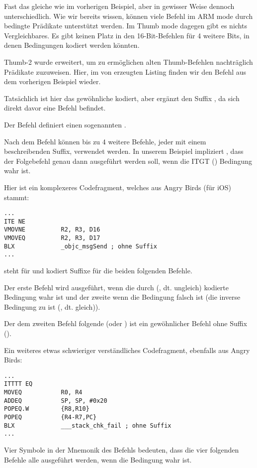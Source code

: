 Fast das gleiche wie im vorherigen Beispiel, aber in gewisser Weise dennoch unterschiedlich.
Wie wir bereits wissen, können viele Befehl im ARM mode durch bedingte Prädikate unterstützt werden.
Im Thumb mode dagegen gibt es nichts Vergleichbares.
Es gibt keinen Platz in den 16-Bit-Befehlen für 4 weitere Bits, in denen Bedingungen kodiert werden könnten.

Thumb-2 wurde erweitert, um zu ermöglichen alten Thumb-Befehlen nachträglich Prädikate zuzuweisen. Hier, im von \IDA
erzeugten Listing finden wir den  Befehl aus dem vorherigen Beispiel wieder.

Tatsächlich ist hier das gewöhnliche  kodiert, aber \IDA ergänzt den Suffix , da sich direkt davor
eine  Befehl befindet.

\label{ARM_Thumb_IT}
Der  Befehl definiert einen sogenannten .

Nach dem Befehl können bis zu 4 weitere Befehle, jeder mit einem beschreibenden Suffix, verwendet werden.
In unserem Beispiel impliziert , dass der Folgebefehl genau dann ausgeführt werden soll, wenn die IT{GT}
() Bedingung wahr ist.

Hier ist ein komplexeres Codefragment, welches aus Angry Birds (für iOS) stammt:

\begin{lstlisting}[caption=Angry Birds Classic,style=customasmARM]
...
ITE NE
VMOVNE          R2, R3, D16
VMOVEQ          R2, R3, D17
BLX             _objc_msgSend ; ohne Suffix
...
\end{lstlisting}

 steht für  und kodiert Suffixe für die beiden folgenden Befehle.

Der erste Befehl wird ausgeführt, wenn die durch  (, dt. ungleich) kodierte Bedingung wahr
ist und der zweite wenn die Bedingung falsch ist (die inverse Bedingung zu  ist  (, dt.
gleich)).

Der dem zweiten Befehl folgende  (oder ) ist ein gewöhnlicher Befehl ohne Suffix ().

Ein weiteres etwas schwieriger verständliches Codefragment, ebenfalls aus Angry Birds:

\begin{lstlisting}[caption=Angry Birds Classic,style=customasmARM]
...
ITTTT EQ
MOVEQ           R0, R4
ADDEQ           SP, SP, #0x20
POPEQ.W         {R8,R10}
POPEQ           {R4-R7,PC}
BLX             ___stack_chk_fail ; ohne Suffix
...
\end{lstlisting}
Vier  Symbole in der Mnemonik des Befehls bedeuten, dass die vier folgenden Befehle alle ausgeführt werden, wenn
die Bedingung wahr ist. 

